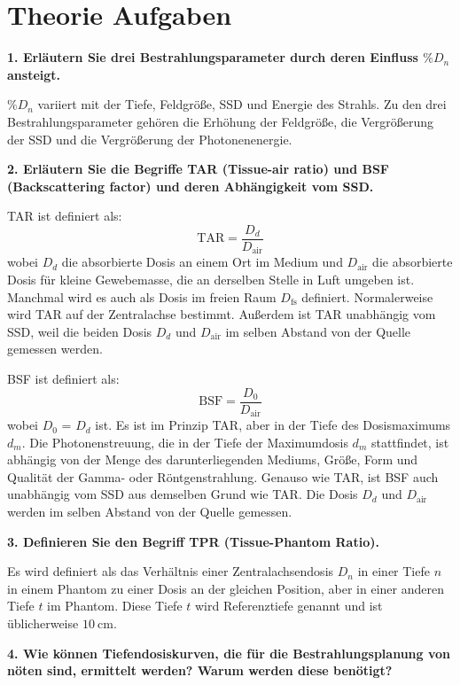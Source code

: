 \section{Theorie Aufgaben}
\label{sec:Theorie}

\textbf{1. Erläutern Sie drei Bestrahlungsparameter durch deren Einfluss $\si{\percent}$$D_n$ ansteigt.}


$\si{\percent}$$D_n$ variiert mit der Tiefe, Feldgröße, SSD und Energie des Strahls.
Zu den drei Bestrahlungsparameter gehören die Erhöhung der Feldgröße, die Vergrößerung der SSD und die Vergrößerung der Photonenenergie.

\textbf{
2. Erläutern Sie die Begriffe TAR (Tissue-air ratio) und BSF (Backscattering factor) und deren Abhängigkeit vom SSD.}

TAR ist definiert als:
\begin{equation*}
\text{TAR} = \frac{D_d}{D_\text{air}}
\end{equation*}
wobei $D_d$ die absorbierte Dosis an einem Ort im Medium und $D_\text{air}$ die absorbierte Dosis für kleine Gewebemasse, die an derselben Stelle in Luft umgeben ist. Manchmal wird es auch als Dosis im freien Raum $D_\text{fs}$ definiert. Normalerweise wird TAR auf der Zentralachse bestimmt. Außerdem ist TAR unabhängig vom SSD, weil die beiden Dosis $D_d$ und $D_\text{air}$ im selben Abstand von der Quelle gemessen werden.

BSF ist definiert als:
\begin{equation*}
\text{BSF} = \frac{D_0}{D_\text{air}}
\end{equation*}
wobei $D_0$ = $D_d$ ist. Es ist im Prinzip TAR, aber in der Tiefe des Dosismaximums $d_m$. Die Photonenstreuung, die in der Tiefe der Maximumdosis $d_m$ stattfindet, ist abhängig von der Menge des darunterliegenden Mediums, Größe, Form und Qualität der Gamma- oder Röntgenstrahlung. Genauso wie TAR, ist BSF auch unabhängig vom SSD aus demselben Grund wie TAR. Die Dosis $D_d$ und $D_\text{air}$ werden im selben Abstand von der Quelle gemessen.

\textbf{3. Definieren Sie den Begriff TPR (Tissue-Phantom Ratio).}

Es wird definiert als das Verhältnis einer Zentralachsendosis $D_n$ in einer Tiefe $n$ in einem Phantom zu einer Dosis an der gleichen Position, aber in
einer anderen Tiefe $t$ im Phantom. Diese Tiefe $t$ wird Referenztiefe genannt und ist üblicherweise $\SI{10}{\centi\meter}$.

\textbf{4. Wie können Tiefendosiskurven, die für die Bestrahlungsplanung von nöten sind, ermittelt werden? Warum werden diese benötigt?}

